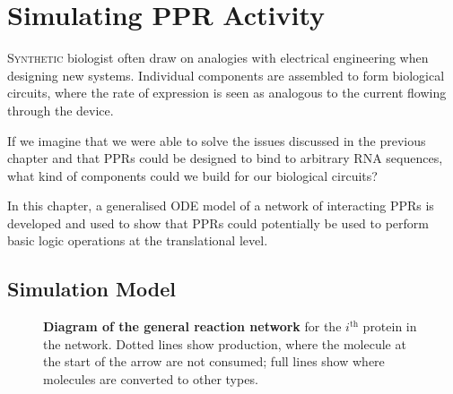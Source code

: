 
\chapter{Simulating PPR Activity} 
\label{chap:simulation}

\lettrine{S}{ynthetic} biologist often draw on analogies with electrical
engineering when designing new systems.
Individual components are assembled to form biological circuits, where the rate
of expression is seen as analogous to the current flowing through the device.

If we imagine that we were able to solve the issues discussed in the previous
chapter and that PPRs could be designed to bind to arbitrary RNA sequences,
what kind of components could we build for our biological circuits?

In this chapter, a generalised ODE model of a network of interacting PPRs is
developed and used to show that PPRs could potentially be used to perform basic
logic operations at the translational level.

\section{Simulation Model}
\label{sec:sim_model}

\begin{figure}
  \centering
  \caption{
  \textbf{Diagram of the general reaction network} 
  for the $i^{\mathrm{th}}$ protein in the network. 
  Dotted lines show production, where the molecule at the start
  of the arrow are not consumed; full lines show where molecules are converted
  to other types.
  \label{fig:simulation}}
\end{figure}

